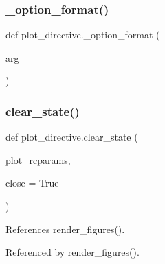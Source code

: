 \mbox{\label{namespaceplot__directive_a247804bf5251adf6fc74548816285f1a}} 
\subsubsection{\texorpdfstring{\+\_\+option\+\_\+format()}{\_option\_format()}}
{\footnotesize\ttfamily def plot\+\_\+directive.\+\_\+option\+\_\+format (\begin{DoxyParamCaption}\item[{}]{arg }\end{DoxyParamCaption})\hspace{0.3cm}{\ttfamily [private]}}

\mbox{\label{namespaceplot__directive_a7577e8f3efd148dc69bb0e39d030c103}} 
\subsubsection{\texorpdfstring{clear\+\_\+state()}{clear\_state()}}
{\footnotesize\ttfamily def plot\+\_\+directive.\+clear\+\_\+state (\begin{DoxyParamCaption}\item[{}]{plot\+\_\+rcparams,  }\item[{}]{close = {\ttfamily True} }\end{DoxyParamCaption})}



References render\+\_\+figures().



Referenced by render\+\_\+figures().

